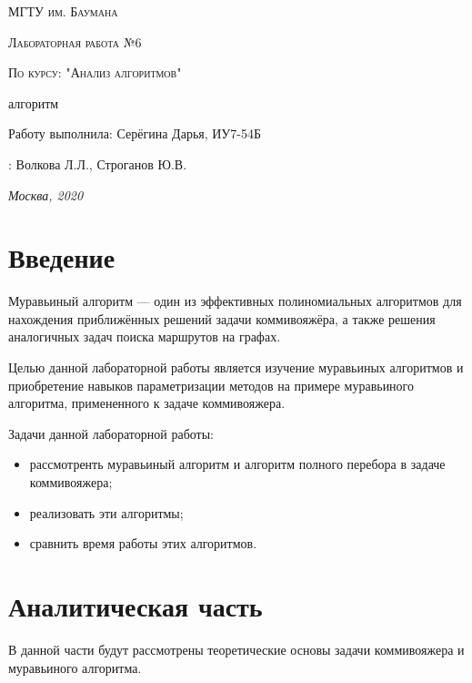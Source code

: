 \documentclass[12pt]{report}
\begin{document}
\begin{titlepage}
	\centering
	{\scshape\LARGE МГТУ им. Баумана \par}
	\vspace{3cm}
	{\scshape\Large Лабораторная работа №6\par}
	\vspace{0.5cm}	
	{\scshape\Large По курсу: "Анализ алгоритмов"\par}
	\vspace{1.5cm}
	{\huge{} алгоритм\par}
	\vspace{2cm}
	\Large Работу выполнила: Серёгина Дарья, ИУ7-54Б\par
	\vspace{0.5cm}
	:  Волкова Л.Л., Строганов Ю.В.\par

	\vfill
	\large \textit {Москва, 2020} \par
\end{titlepage}

\tableofcontents

\newpage
\chapter*{Введение}
Муравьиный алгоритм — один из эффективных полиномиальных алгоритмов для нахождения приближённых решений задачи коммивояжёра, а также решения аналогичных задач поиска маршрутов на графах.
        
Целью данной лабораторной работы является изучение муравьиных алгоритмов и приобретение навыков параметризации методов на примере муравьиного алгоритма, примененного к задаче коммивояжера.
        
Задачи данной лабораторной работы:
\begin{itemize}
	\item рассмотренть муравьиный алгоритм и алгоритм полного перебора в задаче коммивояжера;
	\item реализовать эти алгоритмы;
	\item сравнить время работы этих алгоритмов.
\end{itemize}



\chapter{Аналитическая часть}
В данной части будут рассмотрены теоретические основы задачи коммивояжера и муравьиного алгоритма. 
		
\end{document}
